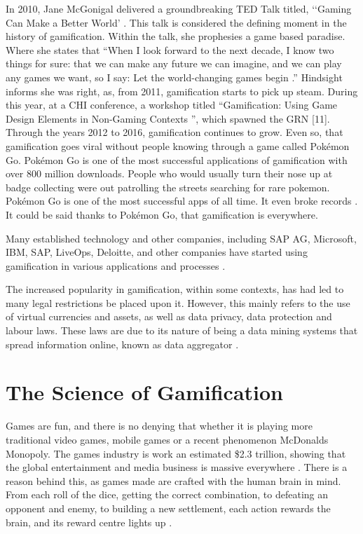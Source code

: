 		In 2010, Jane McGonigal delivered a groundbreaking TED Talk titled, ‘‘Gaming Can Make a Better World’ \cite{janeted}. This talk is considered the defining moment in the history of gamification. Within the talk, she prophesies a game based paradise. Where she states that “When I look forward to the next decade, I know two things for sure: that we can make any future we can imagine, and we can play any games we want, so I say: Let the world-changing games begin \cite{janeted}.” Hindsight informs she was right, as, from 2011, gamification starts to pick up steam. During this year, at a \ac{CHI} conference, a workshop titled “Gamification: Using Game Design Elements in Non-Gaming Contexts \cite{chi2011}”, which spawned the \ac{GRN} [11]. Through the years 2012 to 2016, gamification continues to grow. Even so, that gamification goes viral without people knowing through a game called Pokémon Go. Pokémon Go is one of the most successful applications of gamification with over 800 million downloads. People who would usually turn their nose up at badge collecting were out patrolling the streets searching for rare pokemon. Pokémon Go is one of the most successful apps of all time. It even broke records \cite{pokegwr,history}. It could be said thanks to Pokémon Go, that gamification is everywhere.
		
		Many established technology and other companies, including SAP AG, Microsoft, IBM, SAP, LiveOps, Deloitte, and other companies have started using gamification in various applications and processes \cite{silv11}.
		
		The increased popularity in gamification, within some contexts, has had led to many legal restrictions be placed upon it. However, this mainly refers to the use of virtual currencies and assets, as well as data privacy, data protection and labour laws. These laws are due to its nature of being a data mining systems that spread information online, known as data aggregator \cite{gamelaw,dataagg}.

	\section{The Science of Gamification}
		\label{sec:google_fu}
		
		Games are fun, and there is no denying that whether it is playing more traditional video games, mobile games or a recent phenomenon McDonalds Monopoly. The games industry is work an estimated \$2.3 trillion, showing that the global entertainment and media business is massive everywhere \cite{gamescience}. There is a reason behind this, as games made are crafted with the human brain in mind. From each roll of the dice, getting the correct combination, to defeating an opponent and enemy, to building a new settlement, each action rewards the brain, and its reward centre lights up \cite{sciencebehind}.
		
